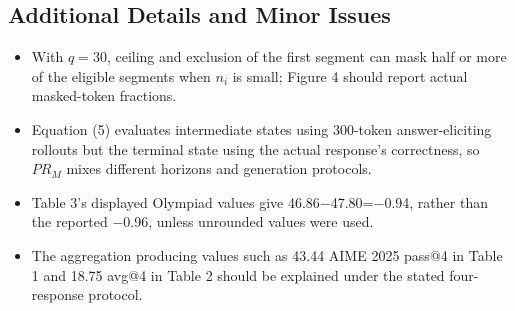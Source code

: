 \subsection*{Additional Details and Minor Issues}
\begin{itemize}
\item With $q = 30$, ceiling and exclusion of the first segment can mask half or more of the eligible segments when $n_i$ is small; Figure 4 should report actual masked-token fractions.
\par{}
\begin{responsebox}[frametitle={Response to M1}]
\vspace*{2\baselineskip}
\end{responsebox}

\item Equation (5) evaluates intermediate states using 300-token answer-eliciting rollouts but the terminal state using the actual response's correctness, so $PR_M$ mixes different horizons and generation protocols.
\par{}
\begin{responsebox}[frametitle={Response to M2}]
\vspace*{2\baselineskip}
\end{responsebox}

\item Table 3's displayed Olympiad values give 46.86\ensuremath{-}47.80=\ensuremath{-}0.94, rather than the reported \ensuremath{-}0.96, unless unrounded values were used.
\par{}
\begin{responsebox}[frametitle={Response to M3}]
\vspace*{2\baselineskip}
\end{responsebox}

\item The aggregation producing values such as 43.44 AIME 2025 pass@4 in Table 1 and 18.75 avg@4 in Table 2 should be explained under the stated four-response protocol.
\par{}
\begin{responsebox}[frametitle={Response to M4}]
\vspace*{2\baselineskip}
\end{responsebox}


\end{itemize}
